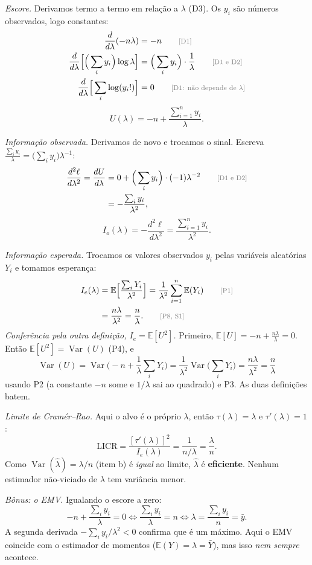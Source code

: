 \documentclass[11pt,a4paper]{article}
\theoremstyle{definition}
\theoremstyle{plain}
\newcommand{\E}{\mathbb{E}}
\newcommand{\Var}{\operatorname{Var}}
\newcommand{\bY}{\bar{Y}}
\newcommand{\just}[1]{\tag*{\footnotesize\textcolor{gray}{[#1]}}}
\begin{document}
\textit{Escore.} Derivamos termo a termo em relação a $\lambda$ (D3). Os $y_i$ são números observados, logo constantes:
\begin{align*}
\frac{d}{d\lambda}(-n\lambda)&=-n \just{D1}\\
\frac{d}{d\lambda}\Big[\Big(\sum_iy_i\Big)\log\lambda\Big]&=\Big(\sum_iy_i\Big)\cdot\frac1\lambda \just{D1 e D2}\\
\frac{d}{d\lambda}\Big[\sum_i\log(y_i!)\Big]&=0 \just{D1: não depende de $\lambda$}
\end{align*}
\[
U(\lambda)=-n+\frac{\sum_{i=1}^ny_i}{\lambda}.
\]

\textit{Informação observada.} Derivamos de novo e trocamos o sinal. Escreva $\frac{\sum_iy_i}{\lambda}=\big(\sum_iy_i\big)\lambda^{-1}$:
\begin{align*}
\frac{d^2\ell}{d\lambda^2}=\frac{dU}{d\lambda}&=0+\Big(\sum_iy_i\Big)\cdot(-1)\lambda^{-2} \just{D1 e D2}\\
&=-\frac{\sum_iy_i}{\lambda^2},
\end{align*}
\[
I_o(\lambda)=-\frac{d^2\ell}{d\lambda^2}=\frac{\sum_{i=1}^ny_i}{\lambda^2}.
\]

\textit{Informação esperada.} Trocamos os valores observados $y_i$ pelas variáveis aleatórias $Y_i$ e tomamos esperança:
\begin{align*}
I_e(\lambda)&=\E\Big[\frac{\sum_iY_i}{\lambda^2}\Big]
=\frac1{\lambda^2}\sum_{i=1}^n\E(Y_i) \just{P1}\\
&=\frac{n\lambda}{\lambda^2}=\frac{n}{\lambda}. \just{P8, S1}
\end{align*}
\textit{Conferência pela outra definição, $I_e=\E[U^2]$.} Primeiro, $\E[U]=-n+\frac{n\lambda}{\lambda}=0$. Então $\E[U^2]=\Var(U)$ (P4), e
\[
\Var(U)=\Var\Big(-n+\frac1\lambda\sum_iY_i\Big)=\frac1{\lambda^2}\Var\Big(\sum_iY_i\Big)=\frac{n\lambda}{\lambda^2}=\frac{n}{\lambda}
\]
usando P2 (a constante $-n$ some e $1/\lambda$ sai ao quadrado) e P3. As duas definições batem.

\textit{Limite de Cramér--Rao.} Aqui o alvo é o próprio $\lambda$, então $\tau(\lambda)=\lambda$ e $\tau'(\lambda)=1$:
\[
\text{LICR}=\frac{[\tau'(\lambda)]^2}{I_e(\lambda)}=\frac{1}{n/\lambda}=\frac{\lambda}{n}.
\]
Como $\Var(\hat\lambda)=\lambda/n$ (item b) é \emph{igual} ao limite, $\hat\lambda$ é \textbf{eficiente}. Nenhum estimador não-viciado de $\lambda$ tem variância menor.

\textit{Bônus: o EMV.} Igualando o escore a zero:
\[
-n+\frac{\sum_iy_i}{\lambda}=0
\iff\frac{\sum_iy_i}{\lambda}=n
\iff\lambda=\frac{\sum_iy_i}{n}=\bar y .
\]
A segunda derivada $-\sum_iy_i/\lambda^2<0$ confirma que é um máximo. Aqui o EMV coincide com o estimador de momentos ($\E(Y)=\lambda=\bY$), mas isso \emph{nem sempre} acontece.
\end{document}
